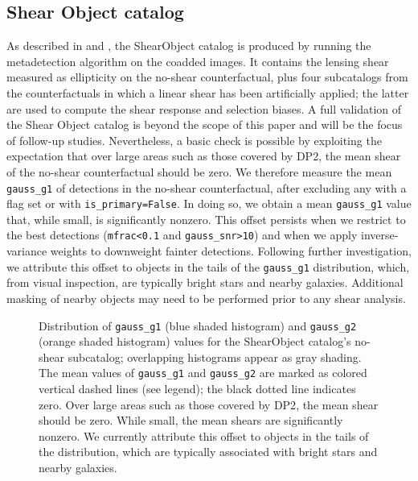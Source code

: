 \subsection{Shear Object catalog}
As described in  and , the \gls{ShearObject} catalog is produced by running the metadetection \gls{algorithm} on the coadded images.
It contains the lensing shear measured as ellipticity on the no-shear counterfactual, plus four subcatalogs from the counterfactuals in which a linear shear has been artificially applied; the latter are used to compute the shear response and selection biases.
A full validation of the Shear \gls{Object} catalog is beyond the scope of this paper and will be the focus of follow-up studies.
Nevertheless, a basic check is possible by exploiting the expectation that over large areas such as those covered by \gls{DP2}, the mean shear of the no-shear counterfactual should be zero.
We therefore measure the mean \texttt{gauss\_g1} of detections in the no-shear counterfactual, after excluding any with a flag set or with \texttt{is\_primary=False}.
In doing so, we obtain a mean \texttt{gauss\_g1} value that, while small, is significantly nonzero.
This offset persists when we restrict to the best detections (\texttt{mfrac<0.1} and \texttt{gauss\_snr>10}) and when we apply inverse-variance weights to downweight fainter detections.
Following further investigation, we attribute this offset to objects in the tails of the \texttt{gauss\_g1} distribution, which, from visual inspection, are typically bright stars and nearby galaxies.
Additional masking of nearby objects may need to be performed prior to any shear analysis.

\begin{figure}[tpb]
\caption{Distribution of \texttt{gauss\_g1} (blue shaded histogram) and \texttt{gauss\_g2} (orange shaded histogram) values for the \gls{ShearObject} catalog's no-shear subcatalog; overlapping histograms appear as gray shading.
The mean values of \texttt{gauss\_g1} and \texttt{gauss\_g2} are marked as colored vertical dashed lines (see legend); the black dotted line indicates zero.
Over large areas such as those covered by \gls{DP2}, the mean shear should be zero.
While small, the mean shears are significantly nonzero.
We currently attribute this offset to objects in the tails of the distribution, which are typically associated with bright stars and nearby galaxies.
}
\label{fig:dp2_object_shear_mean}
\end{figure}

